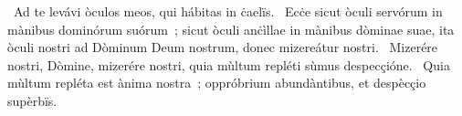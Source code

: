 ~Ad te levávi òculos meos, qui hábitas in ċaelïs. 
~Ecċe sicut òculi servórum in mànibus dominórum suórum~; sicut òculi anċìllae in mànibus dòminae suae, ita òculi nostri ad Dòminum Deum nostrum, donec mizereátur nostri. 
~Mizerére nostri, Dòmine, mizerére nostri, quia mùltum repléti sùmus despecçióne. 
~Quia mùltum repléta est ànima nostra~; oppróbrium abundàntibus, et despècçio supèrbïs. 
